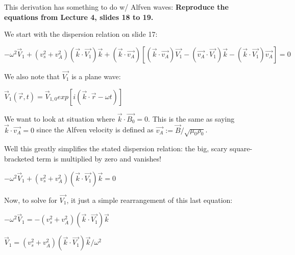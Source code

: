 This derivation has something to do w/ Alfven waves: 
\textbf{Reproduce the equations from Lecture 4, slides 18 to 19.}

We start with the dispersion relation on slide 17:

\vspace{5mm}

$ -\omega^{2} \vec{V}_{1} +
(v_{s}^{2}+v_{A}^{2})(\vec{k}\cdot\vec{V_{1}})\vec{k}+(\vec{k}\cdot\vec{v_{A}})[(\vec{k}\cdot\vec{v_{A}})\vec{V_{1}}-(\vec{v_{A}}\cdot\vec{V_{1}})\vec{k}-(\vec{k}\cdot\vec{V_{1}})\vec{v_{A}}]=0$

\vspace{5mm}

We also note that $\vec{V_{1}}$ is a plane wave:

\vspace{5mm}

\begin{center}
  $\vec{V}_{1}(\vec{r},t) =
  \vec{V}_{1,0}exp[i(\vec{k}\cdot\vec{r}-\omega t)]$
\end{center}

\vspace{5mm}

We want to look at situation where $\vec{k}\cdot\vec{B_{0}}=0$. This is
the same as saying $\vec{k}\cdot\vec{v_{A}}=0$ since the Alfven velocity
is defined as $\vec{v_{A}}:=\vec{B}/\sqrt{\mu_{0}\rho_{0}}$.

Well this greatly simplifies the stated dispersion relation: the big,
scary square-bracketed term is multiplied by zero and vanishes!

\vspace{5mm}

\begin{center}
$-\omega^{2} \vec{V}_{1} + (v_{s}^{2}+v_{A}^{2})(\vec{k}\cdot\vec{V_{1}})\vec{k}=0$
\end{center}

\vspace{5mm}

Now, to solve for $\vec{V_{1}}$, it just a simple rearrangement of this
last equation:

\vspace{5mm}

\begin{center}
$-\omega^{2} \vec{V}_{1} = -(v_{s}^{2}+v_{A}^{2})(\vec{k}\cdot\vec{V_{1}})\vec{k}$

$\vec{V}_{1} = (v_{s}^{2}+v_{A}^{2})(\vec{k}\cdot\vec{V_{1}})\vec{k}/\omega^{2} $
\end{center}

